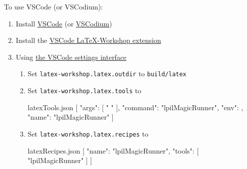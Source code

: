 

To use VSCode (or VSCodium):

\begin{enumerate}
  \item Install \href{https://code.visualstudio.com/}{VSCode} (or
  \href{https://vscodium.com/}{VSCodium})
  \item Install the
  \href{https://open-vsx.org/extension/James-Yu/latex-workshop}{VSCode
  LaTeX-Workshop extension}
  \item Using \href{https://code.visualstudio.com/docs/getstarted/settings}{the
  VSCode settings interface}
  \begin{enumerate}
    \item Set \verb|latex-workshop.latex.outdir| to \verb|build/latex|
    \item Set \verb|latex-workshop.latex.tools| to 
\begin{lpil:json}{latexTools.json}
  [
    {
      "args": [
        "%
        "%
      ],
      "command": "lpilMagicRunner",
      "env": {},
      "name": "lpilMagicRunner"
    }
  ]
\end{lpil:json}
    \item Set \verb|latex-workshop.latex.recipes| to
\begin{lpil:json}{latexRecipes.json}
  [
    {
      "name": "lpilMagicRunner",
      "tools": [
        "lpilMagicRunner"
      ]
    }
  ]
\end{lpil:json}
  \end{enumerate}
\end{enumerate}